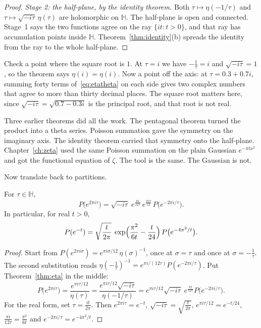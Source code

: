 \begin{proof}
\emph{Stage 2: the half-plane, by the identity theorem.} Both $\tau\mapsto\eta(-1/\tau)$ and $\tau\mapsto\sqrt{-i\tau}\,\eta(\tau)$ are holomorphic on $\mathbb H$. The half-plane is open and connected. Stage~1 says the two functions agree on the ray $\{it:t>0\}$, and that ray has accumulation points inside $\mathbb H$. Theorem~\ref{thm:identity}(b) spreads the identity from the ray to the whole half-plane.
\end{proof}

Check a point where the square root is $1$. At $\tau=i$ we have $-\frac1\tau=i$ and $\sqrt{-i\tau}=1$, so the theorem says $\eta(i)=\eta(i)$. Now a point off the axis: at $\tau=0.3+0.7i$, summing forty terms of~\eqref{eq:etatheta} on each side gives two complex numbers that agree to more than thirty decimal places. The square root matters here, since $\sqrt{-i\tau}=\sqrt{0.7-0.3i}$ is the principal root, and that root is not real.

Three earlier theorems did all the work. The pentagonal theorem turned the product into a theta series. Poisson summation gave the symmetry on the imaginary axis. The identity theorem carried that symmetry onto the half-plane. Chapter~\ref{ch:zeta} used the same Poisson summation on the plain Gaussian $e^{-\pi t x^2}$ and got the functional equation of $\zeta$. The tool is the same. The Gaussian is not.

Now translate back to partitions.

\begin{lemma}\label{lem:ptrans}
For $\tau\in\mathbb H$,
\[
P\bigl(e^{2\pi i\tau}\bigr)=\sqrt{-i\tau}\;e^{\frac{\pi i}{12\tau}}\,e^{\frac{\pi i\tau}{12}}\,P\bigl(e^{-2\pi i/\tau}\bigr).
\]
In particular, for real $t>0$,
\[
P(e^{-t})=\sqrt{\frac t{2\pi}}\;\exp\Bigl(\frac{\pi^2}{6t}-\frac t{24}\Bigr)\,P\bigl(e^{-4\pi^2/t}\bigr).
\]
\end{lemma}
\begin{proof}
Start from $P(e^{2\pi i\sigma})=e^{\pi i\sigma/12}\,\eta(\sigma)^{-1}$, once at $\sigma=\tau$ and once at $\sigma=-\frac1\tau$. The second substitution reads $\eta(-\frac1\tau)^{-1}=e^{\pi i/(12\tau)}P(e^{-2\pi i/\tau})$. Put Theorem~\ref{thm:eta} in the middle:
\[
P\bigl(e^{2\pi i\tau}\bigr)=\frac{e^{\pi i\tau/12}}{\eta(\tau)}=\frac{e^{\pi i\tau/12}\sqrt{-i\tau}}{\eta(-1/\tau)}=e^{\pi i\tau/12}\sqrt{-i\tau}\;e^{\frac{\pi i}{12\tau}}P\bigl(e^{-2\pi i/\tau}\bigr).
\]
For the real form, set $\tau=\frac{it}{2\pi}$. Then $e^{2\pi i\tau}=e^{-t}$, $\sqrt{-i\tau}=\sqrt{\frac t{2\pi}}$, $e^{\pi i\tau/12}=e^{-t/24}$, $\frac{\pi i}{12\tau}=\frac{\pi^2}{6t}$ and $e^{-2\pi i/\tau}=e^{-4\pi^2/t}$.
\end{proof}

